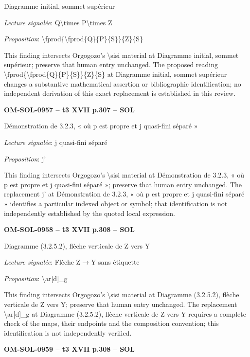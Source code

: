 Diagramme initial, sommet supérieur\par
\emph{Lecture signalée}: Q\textbackslash{}times P\textbackslash{}times Z\par
\emph{Proposition}: \textbackslash{}fprod\{\textbackslash{}fprod\{Q\}\{P\}\{S\}\}\{Z\}\{S\}\par
This finding intersects Orgogozo's \textbackslash{}sisi material at Diagramme initial, sommet supérieur; preserve that human entry unchanged. The proposed reading \textbackslash{}fprod\{\textbackslash{}fprod\{Q\}\{P\}\{S\}\}\{Z\}\{S\} at Diagramme initial, sommet supérieur changes a substantive mathematical assertion or bibliographic identification; no independent derivation of this exact replacement is established in this review.\par
\par\noindent\textbf{OM-SOL-0957 -- t3 XVII p.307 -- SOL}\par
Démonstration de 3.2.3, « où p est propre et j quasi-fini séparé »\par
\emph{Lecture signalée}: j quasi-fini séparé\par
\emph{Proposition}: j'\par
This finding intersects Orgogozo's \textbackslash{}sisi material at Démonstration de 3.2.3, « où p est propre et j quasi-fini séparé »; preserve that human entry unchanged. The replacement j' at Démonstration de 3.2.3, « où p est propre et j quasi-fini séparé » identifies a particular indexed object or symbol; that identification is not independently established by the quoted local expression.\par
\par\noindent\textbf{OM-SOL-0958 -- t3 XVII p.308 -- SOL}\par
Diagramme (3.2.5.2), flèche verticale de Z vers Y\par
\emph{Lecture signalée}: Flèche Z\ensuremath{\to}Y sans étiquette\par
\emph{Proposition}: \textbackslash{}ar[d]\_g\par
This finding intersects Orgogozo's \textbackslash{}sisi material at Diagramme (3.2.5.2), flèche verticale de Z vers Y; preserve that human entry unchanged. The replacement \textbackslash{}ar[d]\_g at Diagramme (3.2.5.2), flèche verticale de Z vers Y requires a complete check of the maps, their endpoints and the composition convention; this identification is not independently verified.\par
\par\noindent\textbf{OM-SOL-0959 -- t3 XVII p.308 -- SOL}\par
